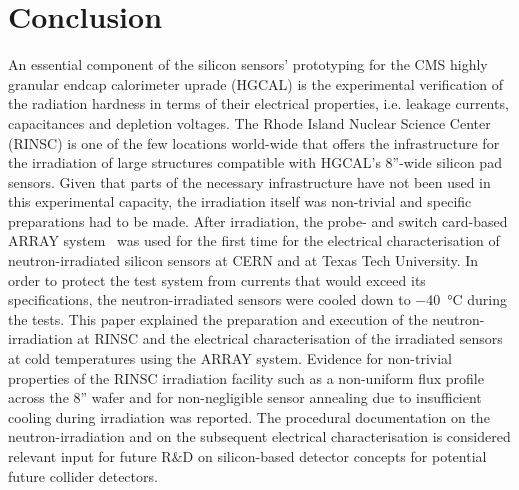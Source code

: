 \section{Conclusion}
\label{sec:conclusion}
An essential component of the silicon sensors' prototyping for the CMS highly granular endcap calorimeter uprade (HGCAL) is the experimental verification of the radiation hardness in terms of their electrical properties, i.e. leakage currents, capacitances and depletion voltages.
The Rhode Island Nuclear Science Center (RINSC) is one of the few locations world-wide that offers the infrastructure for the irradiation of large structures compatible with HGCAL's 8''-wide silicon pad sensors.
Given that parts of the necessary infrastructure have not been used in this experimental capacity, the irradiation itself was non-trivial and specific preparations had to be made.
After irradiation, the probe- and switch card-based ARRAY system~\cite{pitters:array2019} was used for the first time for the electrical characterisation of neutron-irradiated silicon sensors at CERN and at Texas Tech University.
In order to protect the test system from currents that would exceed its specifications, the neutron-irradiated sensors were cooled down to \SI{-40}{\celsius} during the tests.%
This paper explained the preparation and execution of the neutron-irradiation at RINSC and the electrical characterisation of the irradiated sensors at cold temperatures using the ARRAY system.
Evidence for non-trivial properties of the RINSC irradiation facility such as a non-uniform flux profile across the 8'' wafer and for non-negligible sensor annealing due to insufficient cooling during irradiation was reported.
The procedural documentation on the neutron-irradiation and on the subsequent electrical characterisation is considered relevant input for future R$\&$D on silicon-based detector concepts for potential future collider detectors.%
